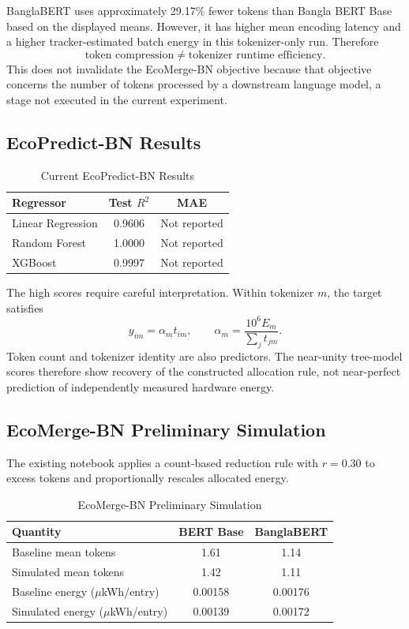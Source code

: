\documentclass[conference]{IEEEtran}
\begin{document}
BanglaBERT uses approximately 29.17\% fewer tokens than Bangla BERT Base based on the displayed means. However, it has higher mean encoding latency and a higher tracker-estimated batch energy in this tokenizer-only run. Therefore
\begin{equation}
\text{token compression}\neq\text{tokenizer runtime efficiency}.
\end{equation}
This does not invalidate the EcoMerge-BN objective because that objective concerns the number of tokens processed by a downstream language model, a stage not executed in the current experiment.

\subsection{EcoPredict-BN Results}
\begin{table}[htbp]
\caption{Current EcoPredict-BN Results}
\label{tab:predict}
\centering
\scriptsize
\begin{tabular}{lcc}
\toprule
\textbf{Regressor} & \textbf{Test $R^2$} & \textbf{MAE}\\
\midrule
Linear Regression & 0.9606 & Not reported\\
Random Forest & 1.0000 & Not reported\\
XGBoost & 0.9997 & Not reported\\
\bottomrule
\end{tabular}
\end{table}

The high scores require careful interpretation. Within tokenizer $m$, the target satisfies
\begin{equation}
y_{im}=\alpha_m t_{im},\qquad \alpha_m=\frac{10^6E_m}{\sum_jt_{jm}}.
\end{equation}
Token count and tokenizer identity are also predictors. The near-unity tree-model scores therefore show recovery of the constructed allocation rule, not near-perfect prediction of independently measured hardware energy.

\subsection{EcoMerge-BN Preliminary Simulation}
The existing notebook applies a count-based reduction rule with $r=0.30$ to excess tokens and proportionally rescales allocated energy.
\begin{table}[htbp]
\caption{EcoMerge-BN Preliminary Simulation}
\label{tab:merge}
\centering
\scriptsize
\begin{tabular}{lcc}
\toprule
\textbf{Quantity} & \textbf{BERT Base} & \textbf{BanglaBERT}\\
\midrule
Baseline mean tokens & 1.61 & 1.14\\
Simulated mean tokens & 1.42 & 1.11\\
Baseline energy ($\mu$kWh/entry) & 0.00158 & 0.00176\\
Simulated energy ($\mu$kWh/entry) & 0.00139 & 0.00172\\
\bottomrule
\end{tabular}
\end{table}
\end{document}
